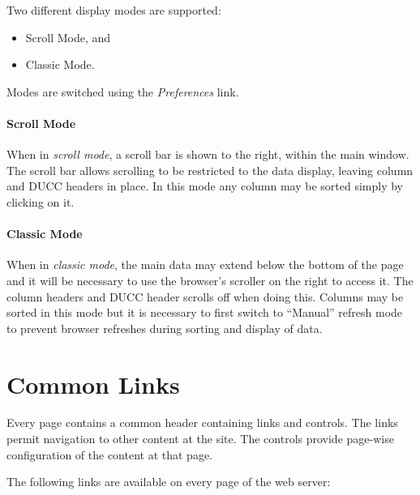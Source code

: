     Two different display modes are supported:
    \begin{itemize}
      \item Scroll Mode, and
      \item Classic Mode.
    \end{itemize}
    Modes are switched using the {\em Preferences} link.

    \paragraph{Scroll Mode}  When in {\em scroll mode}, a scroll bar is shown to the right, within
    the main window.  The scroll bar allows scrolling to be restricted to the data
    display, leaving column and DUCC headers in place.  In this mode any column may be sorted
    simply by clicking on it.

    \paragraph{Classic Mode}  When in {\em classic mode}, the main data may extend below the 
    bottom of the page and it will be necessary to use the browser's scroller on the right
    to access it.  The column headers and DUCC header scrolls off when doing this.  Columns
    may be sorted in this mode but it is necessary to first switch to ``Manual'' refresh mode to
    prevent browser refreshes during sorting and display of data. 

\ifpdf
\else
{}
\fi
    \section{Common Links}

        Every page contains a common header containing links and controls. The links permit navigation
        to other content at the site. The controls provide page-wise configuration of the content at
        that page.

        The following links are available on every page of the web server: 


